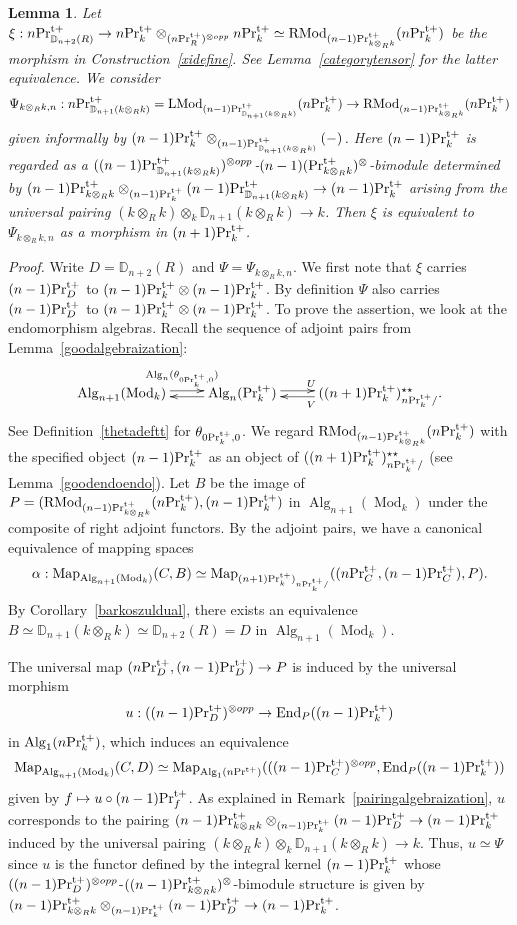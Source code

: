 \documentclass[leqno,12pt]{amsart}
\theoremstyle{plain}
\newtheorem{Lemma}[Theorem]{Lemma}
\theoremstyle{definition}
\newcommand{\DD}{\mathbb{D}}
\newcommand{\PRTT}{\textup{Pr}^{\textup{t}+}}
\newcommand{\Mod}{\operatorname{Mod}}
\newcommand{\Map}{\operatorname{Map}}
\newcommand{\Alg}{\operatorname{Alg}}
\newcommand{\End}{\operatorname{End}}
\newcommand{\LMod}{\operatorname{LMod}}
\newcommand{\RMod}{\operatorname{RMod}}
\newcommand{\Proof}{{\sl Proof.}\quad}
\begin{document}
\begin{Lemma}
\label{indxi}
Let
$\xi:n\PRTT_{\DD_{n+2}(R)}\to n\PRTT_k\otimes_{(n\PRTT_R)^{\otimes opp}}n\PRTT_k \simeq\RMod_{(n-1)\PRTT_{k\otimes_Rk}}(n\PRTT_k)$
be the morphism in Construction~\ref{xidefine}. See Lemma~\ref{categorytensor} for the latter equivalence.
We consider 
\[
\Psi_{k\otimes_Rk,n}:n\PRTT_{\DD_{n+1}(k\otimes_Rk)}=\LMod_{(n-1)\PRTT_{\DD_{n+1}(k\otimes_Rk)}}(n\PRTT_k)  \to \RMod_{(n-1)\PRTT_{k\otimes_Rk}}(n\PRTT_k)
\]
given informally by $(n-1)\PRTT_k\otimes_{(n-1)\PRTT_{\DD_{n+1}(k\otimes_Rk)}}(-)$.
Here $(n-1)\PRTT_k$
is regarded as a $((n-1)\PRTT_{\DD_{n+1}(k\otimes_Rk)})^{\otimes opp}$-$(n-1)(\PRTT_{k\otimes_Rk})^{\otimes}$-bimodule determined by
 $(n-1)\PRTT_{k\otimes_Rk}\otimes_{(n-1)\PRTT_k}(n-1)\PRTT_{\DD_{n+1}(k\otimes_Rk)}\to (n-1)\PRTT_k$ arising from the universal pairing $(k\otimes_Rk)\otimes_k\DD_{n+1}(k\otimes_Rk)\to k$.
Then $\xi$ is equivalent to $\Psi_{k\otimes_Rk,n}$ as a morphism in $(n+1)\PRTT_k$.
\end{Lemma}

\Proof
Write $D=\DD_{n+2}(R)$ and $\Psi=\Psi_{k\otimes_Rk,n}$.
We first note that $\xi$ carries $(n-1)\PRTT_D$ to $(n-1)\PRTT_k\otimes(n-1)\PRTT_k $.
By definition $\Psi$ also carries $(n-1)\PRTT_D$ to $(n-1)\PRTT_k\otimes (n-1)\PRTT_k$.
To prove the assertion, we look at the endomorphism algebras.  
Recall the sequence of adjoint pairs from Lemma~\ref{goodalgebraization}:
\[
\xymatrix{
\Alg_{n+1}(\Mod_k)   \ar@<0.5ex>[r]^{\Alg_{n}(\theta_{0\PRTT_k,0})}  & \Alg_{n}(\PRTT_k)  \ar@<0.5ex>[l]   \ar@<0.5ex>[r]^{U}  &  ((n+1)\PRTT_k)_{n\PRTT_k/}^{\star \star}    \ar@<0.5ex>[l]^{V}  .
}
\]
See Definition~\ref{thetadeftt} for $\theta_{0\PRTT_k,0}$.
We regard
$\RMod_{(n-1)\PRTT_{k\otimes_Rk}}(n\PRTT_k)$ with the specified object $(n-1)\PRTT_k$ as an object of $((n+1)\PRTT_k)_{n\PRTT_k/}^{\star \star}$ (see Lemma~\ref{goodendoendo}).
Let $B$ be the image of $P=(\RMod_{(n-1)\PRTT_{k\otimes_Rk}}(n\PRTT_k),(n-1)\PRTT_k)$ in $\Alg_{n+1}(\Mod_k)$ under the composite of right adjoint functors.
By the adjoint pairs, we have a canonical equivalence of mapping spaces 
\[
\alpha:\Map_{\Alg_{n+1}(\Mod_k)}(C,B)\simeq \Map_{(n+1)\PRTT_k)_{n\PRTT_k/}}((n\PRTT_C,(n-1)\PRTT_C),P).
\]
By Corollary~\ref{barkoszuldual}, 
there exists an equivalence $B\simeq \DD_{n+1}(k\otimes_Rk)\simeq \DD_{n+2}(R)=D$ in $\Alg_{n+1}(\Mod_k)$. 


The universal map
$(n\PRTT_D,(n-1)\PRTT_D)\to P$ is induced by the universal morphism
\[
u:((n-1)\PRTT_D)^{\otimes opp} \to \End_{P}((n-1)\PRTT_k)
\]
in $\Alg_{1}(n\PRTT_k)$,
which induces an equivalence
\[
\Map_{\Alg_{n+1}(\Mod_k)}(C,D)\simeq \Map_{\Alg_1(n\PRTT)}(((n-1)\PRTT_C)^{\otimes opp}, \End_{P}((n-1)\PRTT_k))
\]
given by $f\mapsto u\circ (n-1)\PRTT_f$.
As explained in Remark~\ref{pairingalgebraization}, $u$ corresponds to the pairing  $(n-1)\PRTT_{k\otimes_Rk}\otimes_{(n-1)\PRTT_k}(n-1)\PRTT_{D}\to (n-1)\PRTT_k$ induced by
the universal pairing $(k\otimes_Rk)\otimes_k\DD_{n+1}(k\otimes_Rk)\to k$.
Thus, $u\simeq \Psi$ since $u$ is the functor defined by the integral kernel
$(n-1)\PRTT_k$ whose $((n-1)\PRTT_D)^{\otimes opp}$-$((n-1)\PRTT_{k\otimes_Rk})^{\otimes}$-bimodule structure is given by
 $(n-1)\PRTT_{k\otimes_Rk}\otimes_{(n-1)\PRTT_k}(n-1)\PRTT_{D}\to (n-1)\PRTT_k$.
\end{document}
